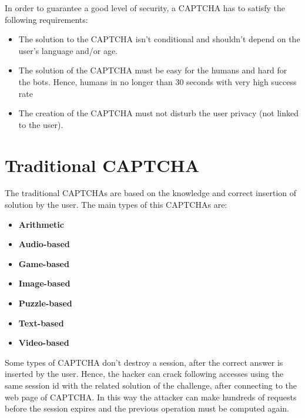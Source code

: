 In order to guarantee a good level of security, a CAPTCHA has to satisfy the following requirements:
\begin{itemize}
\item{The solution to the CAPTCHA isn't conditional and shouldn't depend on the user's language and/or age.}
\item{The solution of the CAPTCHA must be easy for the humans and hard for the bots. Hence, humans in no longer than 30 seconds with very high success rate}
\item{The creation of the CAPTCHA must not disturb the user privacy (not linked to the user).}
\end{itemize}

\section{Traditional CAPTCHA}
The traditional CAPTCHAs are based on the knowledge and correct insertion of solution by the user. The main types of this CAPTCHAs are: 
\begin{itemize}
\item{\textbf{Arithmetic}\\
}
\item{\textbf{Audio-based}\\
}
\item{\textbf{Game-based}\\
}
\item{\textbf{Image-based}\\
}
\item{\textbf{Puzzle-based}\\
}
\item{\textbf{Text-based}\\
}
\item{\textbf{Video-based}\\
}
\end{itemize}
Some types of CAPTCHA don't destroy a session, after the correct answer is inserted by the user\cite{text_audio}. Hence, the hacker can crack following accesses using the same session id with the related solution of the challenge, after connecting to the web page of CAPTCHA. In this way the attacker can make hundreds of requests before the session expires and the previous operation must be computed again.

